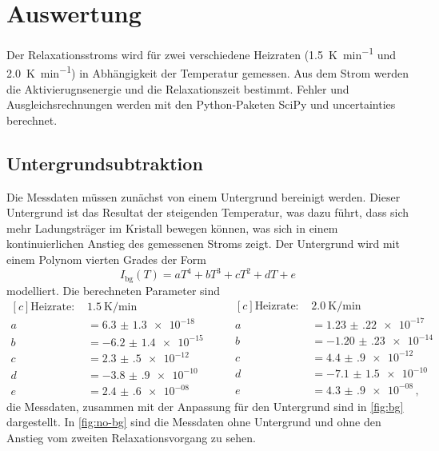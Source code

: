 \section{Auswertung}

Der Relaxationsstroms wird für zwei verschiedene Heizraten (\SI{1.5}{\kelvin\per\minute} und \SI{2.0}{\kelvin\per\minute}) in Abhängigkeit der Temperatur gemessen. Aus dem Strom werden die Aktivierugnsenergie und die Relaxationszeit bestimmt. Fehler und Ausgleichsrechnungen werden mit den Python-Paketen SciPy \cite{scipy} und uncertainties \cite{uncertain} berechnet.

\subsection{Untergrundsubtraktion}

Die Messdaten müssen zunächst von einem Untergrund bereinigt werden. Dieser Untergrund ist das Resultat der steigenden Temperatur, was dazu führt, dass sich mehr Ladungsträger im Kristall bewegen können, was sich in einem kontinuierlichen Anstieg des gemessenen Stroms zeigt. Der Untergrund wird mit einem Polynom vierten Grades der Form
\begin{equation}
  I_\text{bg}(T) = aT^4 + bT^3 + cT^2 + dT + e
\end{equation}
modelliert. Die berechneten Parameter sind
\begin{equation*}
\begin{aligned}[c]
  \text{Heizrate: }& \SI{1.5}{\kelvin\per\minute}\\
  a &= \num{6.3(13)e-18}\\
  b &= \num{-6.2(14)e-15}\\
  c &= \num{2.3(5)e-12}\\
  d &= \num{-3.8(9)e-10}\\
  e &= \num{2.4(6)e-08}
\end{aligned}
\qquad
\begin{aligned}[c]
  \text{Heizrate: }& \SI{2.0}{\kelvin\per\minute}\\
  a &= \num{1.23(22)e-17}\\
  b &= \num{-1.20(23)e-14}\\
  c &= \num{4.4(9)e-12}\\
  d &= \num{-7.1(15)e-10}\\
  e &= \num{4.3(9)e-08}\,,
\end{aligned}
\end{equation*}
die Messdaten, zusammen mit der Anpassung für den Untergrund sind in \autoref{fig:bg} dargestellt. In \autoref{fig:no-bg} sind die Messdaten ohne Untergrund und ohne den Anstieg vom zweiten Relaxationsvorgang zu sehen.

